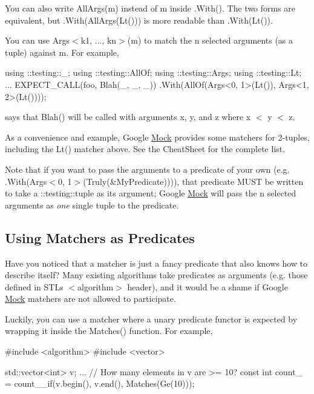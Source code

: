 You can also write {\ttfamily All\+Args(m)} instead of {\ttfamily m} inside {\ttfamily .With()}. The two forms are equivalent, but {\ttfamily .With(All\+Args(\+Lt()))} is more readable than {\ttfamily .With(\+Lt())}.

You can use {\ttfamily Args$<$k1, ..., kn$>$(m)} to match the {\ttfamily n} selected arguments (as a tuple) against {\ttfamily m}. For example,


\begin{DoxyCode}
using ::testing::\_;
using ::testing::AllOf;
using ::testing::Args;
using ::testing::Lt;
...
  EXPECT\_CALL(foo, Blah(\_, \_, \_))
      .With(AllOf(Args<0, 1>(Lt()), Args<1, 2>(Lt())));
\end{DoxyCode}


says that {\ttfamily Blah()} will be called with arguments {\ttfamily x}, {\ttfamily y}, and {\ttfamily z} where {\ttfamily x $<$ y $<$ z}.

As a convenience and example, Google \hyperlink{classMock}{Mock} provides some matchers for 2-\/tuples, including the {\ttfamily Lt()} matcher above. See the Cheat\+Sheet for the complete list.

Note that if you want to pass the arguments to a predicate of your own (e.\+g. {\ttfamily .With(Args$<$0, 1$>$(Truly(\&\+My\+Predicate)))}), that predicate M\+U\+ST be written to take a {\ttfamily \+::testing\+::tuple} as its argument; Google \hyperlink{classMock}{Mock} will pass the {\ttfamily n} selected arguments as {\itshape one} single tuple to the predicate.

\subsection*{Using Matchers as Predicates}

Have you noticed that a matcher is just a fancy predicate that also knows how to describe itself? Many existing algorithms take predicates as arguments (e.\+g. those defined in S\+TL\textquotesingle{}s {\ttfamily $<$algorithm$>$} header), and it would be a shame if Google \hyperlink{classMock}{Mock} matchers are not allowed to participate.

Luckily, you can use a matcher where a unary predicate functor is expected by wrapping it inside the {\ttfamily Matches()} function. For example,


\begin{DoxyCode}
\textcolor{preprocessor}{#include <algorithm>}
\textcolor{preprocessor}{#include <vector>}

std::vector<int> v;
...
\textcolor{comment}{// How many elements in v are >= 10?}
const \textcolor{keywordtype}{int} count_ = count_\_if(v.begin(), v.end(), Matches(Ge(10)));
\end{DoxyCode}



